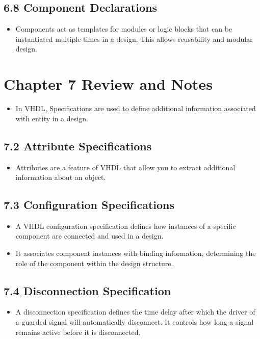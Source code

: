 \documentclass[a4paper,12pt]{article}
\begin{document}
	\subsection*{6.8 Component Declarations}
	\begin{itemize}
		\item Components act as templates for modules or logic blocks that can be instantiated multiple times in a design. This allows reusability and modular design.
	\end{itemize}
	
	
	
	\section{Chapter 7 Review and Notes}
	\begin{itemize}
		\item In VHDL, Specifications are used to define additional information associated with entity in a design.
	\end{itemize}
	
	\subsection*{7.2 Attribute Specifications}
	\begin{itemize}
		\item Attributes are a feature of VHDL that allow you to extract additional information about an object.
	\end{itemize}
	
	\subsection*{7.3 Configuration Specifications}
	\begin{itemize}
		\item A VHDL configuration specification defines how instances of a specific component are connected and used in a design.
		\item It associates component instances with binding information, determining the role of the component within the design structure.
	\end{itemize}
	
	\subsection*{7.4 Disconnection Specification}
	\begin{itemize}
		\item A disconnection specification defines the time delay after which the driver of a guarded signal will automatically disconnect. It controls how long a signal remains active before it is disconnected.
	\end{itemize}
	
\end{document}
